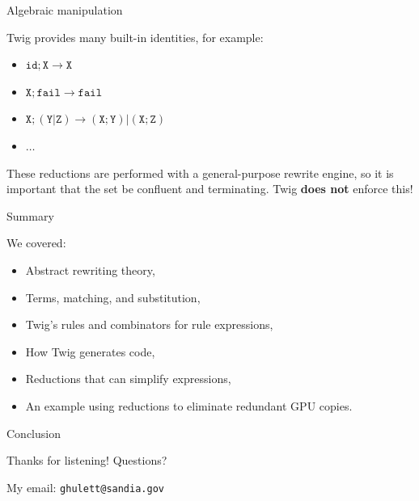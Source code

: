 \documentclass{beamer}
\begin{document}
\begin{frame}[fragile]{Algebraic manipulation}

Twig provides many built-in identities, for example:

\begin{itemize}
  \item $\mathtt{id;X} \to \mathtt{X}$
  \item $\mathtt{X;fail} \to \mathtt{fail}$
  \item $\mathtt{X;(Y|Z)} \to \mathtt{(X;Y)|(X;Z)}$
  \item $\ldots$
\end{itemize}

These reductions are performed with a general-purpose rewrite engine, so it is
important that the set be confluent and terminating. Twig \textbf{does not}
enforce this!

\end{frame}


\begin{frame}[fragile]{Summary}

We covered:

\begin{itemize}
  \item Abstract rewriting theory,
  \item Terms, matching, and substitution,
  \item Twig's rules and combinators for rule expressions,
  \item How Twig generates code,
  \item Reductions that can simplify expressions,
  \item An example using reductions to eliminate redundant GPU copies.
\end{itemize}

\end{frame}


\begin{frame}{Conclusion}

Thanks for listening! Questions?

My email: \texttt{ghulett@sandia.gov}

\end{frame}
\end{document}
